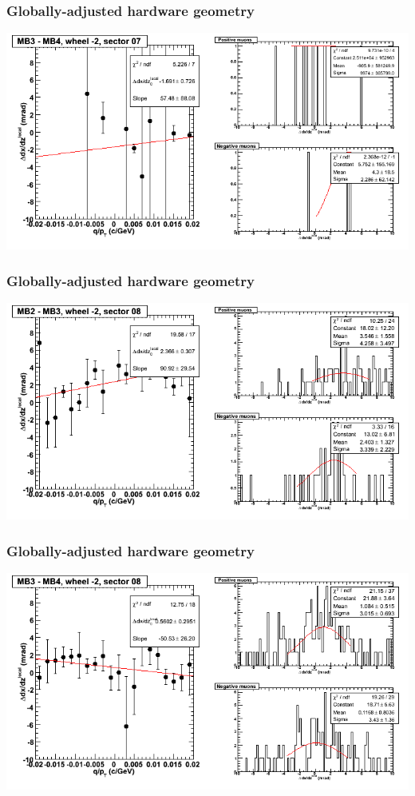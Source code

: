\documentclass[compress]{beamer}
\begin{document}
\begin{frame}
\frametitle{Globally-adjusted hardware geometry}
\includegraphics[width=\linewidth]{NOV4_segdiffs_HW/dt13_slope_A_07_34.png}
\end{frame}

\begin{frame}
\frametitle{Globally-adjusted hardware geometry}
\includegraphics[width=\linewidth]{NOV4_segdiffs_HW/dt13_slope_A_08_23.png}
\end{frame}

\begin{frame}
\frametitle{Globally-adjusted hardware geometry}
\includegraphics[width=\linewidth]{NOV4_segdiffs_HW/dt13_slope_A_08_34.png}
\end{frame}
\end{document}
